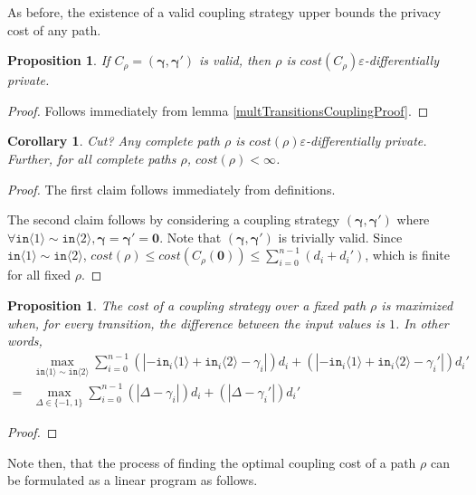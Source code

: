 \documentclass[12pt]{article}
\newcommand{\brangle}[1]{\langle #1 \rangle}
\newtheorem{prop}[thm]{Proposition}
\newtheorem{cor}[thm]{Corollary}
\theoremstyle{definition}
\begin{document}
As before, the existence of a valid coupling strategy upper bounds the privacy cost of any path. 

\begin{prop}
    If $C_\rho=(\bm{\gamma}, \bm{\gamma}')$ is valid, then $\rho$ is $cost(C_\rho)\varepsilon$-differentially private.
\end{prop}

\begin{proof}
    Follows immediately from lemma \ref{multTransitionsCouplingProof}.
\end{proof}

\begin{cor}{\color{red} Cut?}
    Any complete path $\rho$ is $cost(\rho)\varepsilon$-differentially private. Further, for all complete paths $\rho$, $cost(\rho)<\infty$. 
\end{cor}

\begin{proof}
    The first claim follows immediately from definitions. 
    
    The second claim follows by considering a coupling strategy $(\bm{\gamma}, \bm{\gamma}')$ where $\forall \texttt{in}\brangle{1}\sim\texttt{in}\brangle{2}, \bm{\gamma} = \bm{\gamma}' = \bm{0}$. Note that $(\bm{\gamma}, \bm{\gamma}')$ is trivially valid. Since $\texttt{in}\brangle{1}\sim\texttt{in}\brangle{2}$, $cost(\rho)\leq cost(C_\rho(\bm{0}))\leq \sum_{i=0}^{n-1}(d_i+d_i')$, which is finite for all fixed $\rho$. 
\end{proof}


\begin{prop}
    The cost of a coupling strategy over a fixed path $\rho$ is maximized when, for every transition, the difference between the input values is $1$. In other words,
    \begin{align*}
        &\max_{\texttt{in}\brangle{1}\sim \texttt{in}\brangle{2}} \sum_{i=0}^{n-1}(|-\texttt{in}_i\brangle{1}+\texttt{in}_i\brangle{2}-\gamma_i|)d_i+(|-\texttt{in}_i\brangle{1}+\texttt{in}_i\brangle{2}-\gamma_i'|)d_i' \\
        = &\max_{\Delta\in \{-1, 1\}} \sum_{i=0}^{n-1}(|\Delta-\gamma_i|)d_i+(|\Delta-\gamma_i'|)d_i'
    \end{align*}
\end{prop}
\begin{proof}
\end{proof}

Note then, that the process of finding the optimal coupling cost of a path $\rho$ can be formulated as a linear program as follows. 
\end{document}
